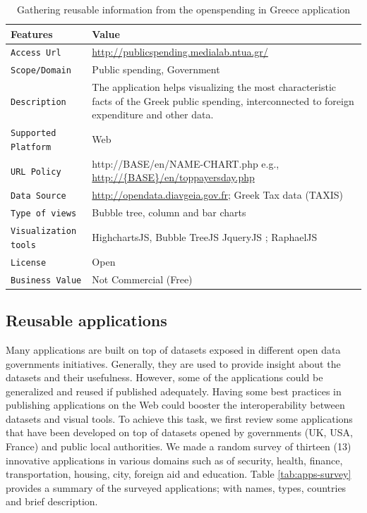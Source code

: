 \begin{table}[ht!b]
    \caption{Gathering reusable information from the openspending in Greece application} \label{tab:describeApps}
    \small
    \center
    \begin{tabularx}{\textwidth}{@{}lX@{}}
    \toprule
    \textbf{Features} & \textbf{Value}\\
    \toprule
    \texttt{Access Url }&	\url{http://publicspending.medialab.ntua.gr/}\\
    \midrule
    \texttt{Scope/Domain} &	Public spending, Government \\
    \midrule
    \texttt{Description} & The application helps visualizing the most characteristic facts of the Greek public spending, interconnected to foreign expenditure and other data. \\
    \midrule
    \texttt{Supported Platform} &	Web \\
    \midrule
    \texttt{URL Policy}   &  http://{BASE}/en/{NAME-CHART}.php e.g., \url{http://{BASE}/en/toppayersday.php} \\
    \midrule
    \texttt{Data Source}	& \url{http://opendata.diavgeia.gov.fr}; Greek Tax data (TAXIS) \\
    \midrule
\texttt{Type of views} & Bubble tree, column and bar charts \\
    \midrule
   \texttt{Visualization tools} &  HighchartsJS,  Bubble TreeJS JqueryJS ; RaphaelJS \\
   \midrule
  \texttt{License} & Open \\
    \midrule
\texttt{Business Value} & Not Commercial (Free) \\
    \bottomrule

    \end{tabularx}
    \end{table}

\subsection{Reusable applications} \label{sec:reusable}
Many applications are built on top of datasets exposed in different open data governments initiatives. Generally, they are used to provide insight about the datasets and their usefulness. However, some of the applications could be generalized and reused if published adequately. Having some best practices in publishing applications on the Web could booster the interoperability between datasets and visual tools. To achieve this task, we first review some applications that have been developed on top of datasets  opened by governments (UK, USA, France) and public local authorities. We made a random survey of thirteen (13) innovative applications \cite{deliverable2012a} in various domains such as of security, health, finance, transportation, housing, city, foreign aid and education. Table \ref{tab:apps-survey} provides a summary of the surveyed applications; with names, types, countries and brief description.

